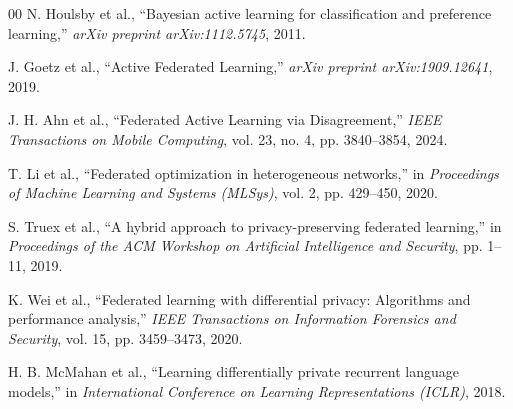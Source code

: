 \documentclass[conference]{IEEEtran}
\begin{document}
\begin{thebibliography}{00}
 N. Houlsby et al., ``Bayesian active learning for classification and preference learning,'' \textit{arXiv preprint arXiv:1112.5745}, 2011.

 J. Goetz et al., ``Active Federated Learning,'' \textit{arXiv preprint arXiv:1909.12641}, 2019.

 J. H. Ahn et al., ``Federated Active Learning via Disagreement,'' \textit{IEEE Transactions on Mobile Computing}, vol. 23, no. 4, pp. 3840--3854, 2024.

 T. Li et al., ``Federated optimization in heterogeneous networks,'' in \textit{Proceedings of Machine Learning and Systems (MLSys)}, vol. 2, pp. 429--450, 2020.

 S. Truex et al., ``A hybrid approach to privacy-preserving federated learning,'' in \textit{Proceedings of the ACM Workshop on Artificial Intelligence and Security}, pp. 1--11, 2019.

 K. Wei et al., ``Federated learning with differential privacy: Algorithms and performance analysis,'' \textit{IEEE Transactions on Information Forensics and Security}, vol. 15, pp. 3459--3473, 2020.

 H. B. McMahan et al., ``Learning differentially private recurrent language models,'' in \textit{International Conference on Learning Representations (ICLR)}, 2018.

\end{thebibliography}
\end{document}
